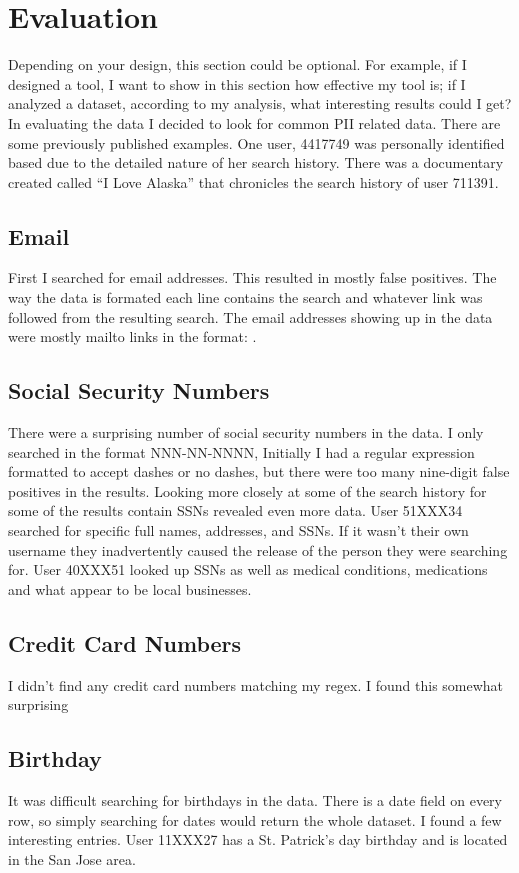 \documentclass{article}
\begin{document}
\section{Evaluation}
Depending on your design, this section could be optional. For example, if I designed a tool, I want to show in this section how effective my tool is; if I analyzed a dataset, according to my analysis, what interesting results could I get?\\

In evaluating the data I decided to look for common PII related data. There are some previously published examples. One user, 4417749 was personally identified based due to the detailed nature of her search history\cite{nyt}. There was a documentary created called “I Love Alaska” that chronicles the search history of user 711391\cite{imdb}.
\subsection{Email}
First I searched for email addresses. This resulted in mostly false positives. The way the data is formated each line contains the search and whatever link was followed from the resulting search. The email addresses showing up in the data were mostly mailto links in the format: .
\subsection{Social Security Numbers}
There were a surprising number of social security numbers in the data. I only searched in the format NNN-NN-NNNN, Initially I had a regular expression formatted to accept dashes or no dashes, but there were too many nine-digit false positives in the results. Looking more closely at some of the search history for some of the results contain SSNs revealed even more data. User 51XXX34 searched for  specific full names, addresses, and SSNs. If it wasn’t their own username they inadvertently caused the release of the person they were searching for. User 40XXX51 looked up SSNs as well as medical conditions, medications and what appear to be local businesses.
\subsection{Credit Card Numbers}
I didn’t find any credit card numbers matching my regex. I found this somewhat surprising
\subsection{Birthday}
It was difficult searching for birthdays in the data. There is a date field on every row, so simply searching for dates would return the whole dataset. I found a few interesting entries. User 11XXX27 has a St. Patrick’s day birthday and is located in the San Jose area.
\end{document}
